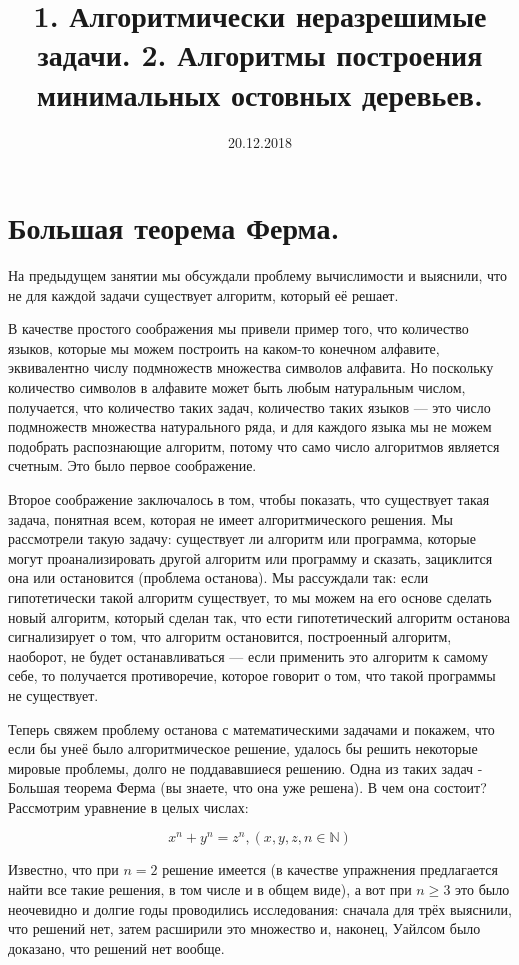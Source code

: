 \documentclass[russian]{lecture-notes}
\title{1. Алгоритмически неразрешимые задачи. 2. Алгоритмы построения минимальных остовных деревьев.}
\date{20.12.2018}
\begin{document}
	
	\maketitle
	\section*{Большая теорема Ферма.}
	На предыдущем занятии мы обсуждали проблему вычислимости и выяснили, что не для каждой задачи существует алгоритм, который её решает. 
	
	В качестве простого соображения мы привели пример того, что количество языков, которые мы можем построить на каком-то конечном алфавите, эквивалентно числу подмножеств множества символов алфавита. Но поскольку количество символов в алфавите может быть любым натуральным числом, получается, что количество таких задач,  количество таких языков --- это число подмножеств множества натурального ряда, и для каждого языка мы не можем подобрать распознающие алгоритм, потому что само число алгоритмов является счетным. Это было первое соображение.
	
	Второе соображение заключалось в том, чтобы показать, что существует такая задача, понятная всем, которая не имеет алгоритмического решения. Мы рассмотрели такую задачу: существует ли алгоритм или программа, которые могут проанализировать другой алгоритм или программу и сказать, зациклится она или остановится (проблема останова). Мы рассуждали так: если гипотетически такой алгоритм  существует, то мы можем на его основе сделать новый алгоритм, который сделан так, что ести гипотетический алгоритм останова сигнализирует о том, что алгоритм остановится, построенный алгоритм, наоборот, не будет останавливаться --- если применить это алгоритм к самому себе, то получается противоречие, которое говорит о том, что такой программы не существует. 
	
	Теперь свяжем проблему останова с математическими задачами и покажем, что если бы унеё было алгоритмическое решение, удалось бы решить некоторые мировые проблемы, долго не поддававшиеся решению. Одна из таких задач - Большая теорема Ферма (вы знаете, что она уже решена). В чем она состоит? Рассмотрим уравнение в целых числах:
	
	\[
	x^n + y^n = z^n, 		(x, y, z, n \in \mathbb{N})
	\]
	
	Известно, что при $n = 2$ решение имеется (в качестве упражнения предлагается найти все такие решения, в том числе и в общем виде), а вот при $n \geq 3$ это было неочевидно и долгие годы проводились исследования: сначала для трёх выяснили, что решений нет, затем расширили это множество и, наконец, Уайлсом было доказано, что решений нет вообще.
	
\end{document}
